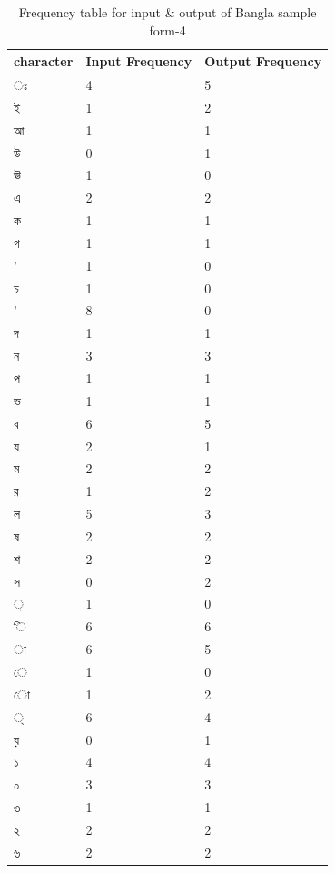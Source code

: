 \begin{table}[H]
\centering
\begin{tabular}{|p{2cm}|p{2cm}|p{2cm}|}
\hline
character & Input Frequency & Output Frequency \\
\hline
{\bengalifont ঃ} & 4 & 5\\
\hline
{\bengalifont ই} & 1 & 2\\
\hline
{\bengalifont আ} & 1 & 1\\
\hline
{\bengalifont উ} & 0 & 1\\
\hline
{\bengalifont ঊ} & 1 & 0\\
\hline
{\bengalifont এ} & 2 & 2\\
\hline
{\bengalifont ক} & 1 & 1\\
\hline
{\bengalifont গ} & 1 & 1\\
\hline
{\bengalifont ’} & 1 & 0\\
\hline
{\bengalifont চ} & 1 & 0\\
\hline
{\bengalifont '} & 8 & 0\\
\hline
{\bengalifont দ} & 1 & 1\\
\hline
{\bengalifont ন} & 3 & 3\\
\hline
{\bengalifont প} & 1 & 1\\
\hline
{\bengalifont ভ} & 1 & 1\\
\hline
{\bengalifont ব} & 6 & 5\\
\hline
{\bengalifont য} & 2 & 1\\
\hline
{\bengalifont ম} & 2 & 2\\
\hline
{\bengalifont র} & 1 & 2\\
\hline
{\bengalifont ল} & 5 & 3\\
\hline
{\bengalifont ষ} & 2 & 2\\
\hline
{\bengalifont শ} & 2 & 2\\
\hline
{\bengalifont স} & 0 & 2\\
\hline
{\bengalifont ়} & 1 & 0\\
\hline
{\bengalifont ি} & 6 & 6\\
\hline
{\bengalifont া} & 6 & 5\\
\hline
{\bengalifont ে} & 1 & 0\\
\hline
{\bengalifont ো} & 1 & 2\\
\hline
{\bengalifont ্} & 6 & 4\\
\hline
{\bengalifont য়} & 0 & 1\\
\hline
{\bengalifont ১} & 4 & 4\\
\hline
{\bengalifont ০} & 3 & 3\\
\hline
{\bengalifont ৩} & 1 & 1\\
\hline
{\bengalifont ২} & 2 & 2\\
\hline
{\bengalifont ৬} & 2 & 2\\
\hline
\end{tabular}
\caption {Frequency table for input \& output of Bangla sample form-4}
\label {tab:BTable4}
\end{table}

